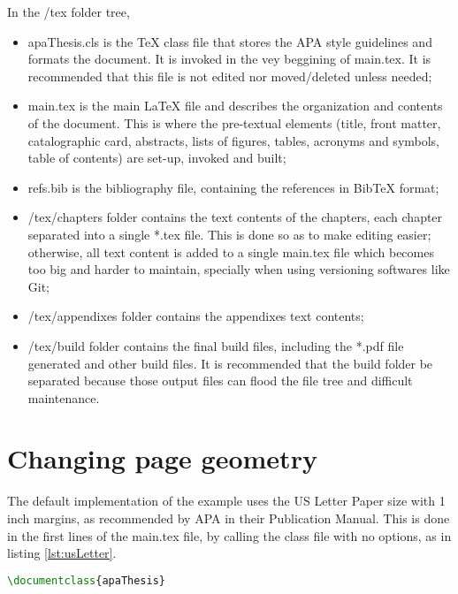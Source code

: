 	In the {\ttfamily\small /tex} folder tree,

\begin{itemize}
	\item {\ttfamily\small apaThesis.cls} is the TeX class file that stores the APA style guidelines and formats the document. It is invoked in the vey beggining of {\ttfamily\small main.tex}. It is recommended that this file is not edited nor moved/deleted unless needed;
	\item {\ttfamily\small main.tex} is the main LaTeX file and describes the organization and contents of the document. This is where the pre-textual elements (title, front matter, catalographic card, abstracts, lists of figures, tables, acronyms and symbols, table of contents) are set-up, invoked and built;
	\item {\ttfamily\small refs.bib} is the bibliography file, containing the references in BibTeX format;
	\item {\ttfamily\small /tex/chapters} folder contains the text contents of the chapters, each chapter separated into a single *.tex file. This is done so as to make editing easier; otherwise, all text content is added to a single main.tex file which becomes too big and harder to maintain, specially when using versioning softwares like Git;
	\item {\ttfamily\small /tex/appendixes} folder contains the appendixes text contents;
	\item {\ttfamily\small /tex/build} folder contains the final build files, including the *.pdf file generated and other build files. It is recommended that the build folder be separated because those output files can flood the file tree and difficult maintenance.
\end{itemize}

	\section{Changing page geometry}%

	The default implementation of the example uses the US Letter Paper size with 1 inch margins, as recommended by APA in their Publication Manual. This is done in the first lines of the {\ttfamily\small main.tex} file, by calling the class file with no options, as in listing \ref{lst:usLetter}.

\begin{lstlisting}[caption = {Using the class with US Letter paper size}, label = {lst:usLetter}, style = prettyListing, language = tex]
\documentclass{apaThesis}
\end{lstlisting}

